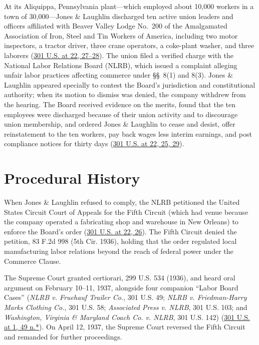 \documentclass[12pt]{article}
\begin{document}
At its Aliquippa, Pennsylvania plant---which employed about 10,000 workers in a town of 30,000---Jones \& Laughlin discharged ten active union leaders and officers affiliated with Beaver Valley Lodge No.\ 200 of the Amalgamated Association of Iron, Steel and Tin Workers of America, including two motor inspectors, a tractor driver, three crane operators, a coke-plant washer, and three laborers (\href{https://supreme.justia.com/cases/federal/us/301/1/}{301 U.S. at 22, 27--28}). The union filed a verified charge with the National Labor Relations Board (NLRB), which issued a complaint alleging unfair labor practices affecting commerce under \S\S~8(1) and 8(3). Jones \& Laughlin appeared specially to contest the Board's jurisdiction and constitutional authority; when its motion to dismiss was denied, the company withdrew from the hearing. The Board received evidence on the merits, found that the ten employees were discharged because of their union activity and to discourage union membership, and ordered Jones \& Laughlin to cease and desist, offer reinstatement to the ten workers, pay back wages less interim earnings, and post compliance notices for thirty days (\href{https://supreme.justia.com/cases/federal/us/301/1/}{301 U.S. at 22, 25, 29}).

\section{Procedural History}

When Jones \& Laughlin refused to comply, the NLRB petitioned the United States Circuit Court of Appeals for the Fifth Circuit (which had venue because the company operated a fabricating shop and warehouse in New Orleans) to enforce the Board's order (\href{https://supreme.justia.com/cases/federal/us/301/1/}{301 U.S. at 22, 26}). The Fifth Circuit denied the petition, 83 F.2d 998 (5th Cir. 1936), holding that the order regulated local manufacturing labor relations beyond the reach of federal power under the Commerce Clause.

The Supreme Court granted certiorari, 299 U.S. 534 (1936), and heard oral argument on February 10--11, 1937, alongside four companion ``Labor Board Cases'' (\textit{NLRB v. Fruehauf Trailer Co.}, 301 U.S. 49; \textit{NLRB v. Friedman-Harry Marks Clothing Co.}, 301 U.S. 58; \textit{Associated Press v. NLRB}, 301 U.S. 103; and \textit{Washington, Virginia \& Maryland Coach Co. v. NLRB}, 301 U.S. 142) (\href{https://supreme.justia.com/cases/federal/us/301/1/}{301 U.S. at 1, 49 n.*}). On April 12, 1937, the Supreme Court reversed the Fifth Circuit and remanded for further proceedings.
\end{document}
